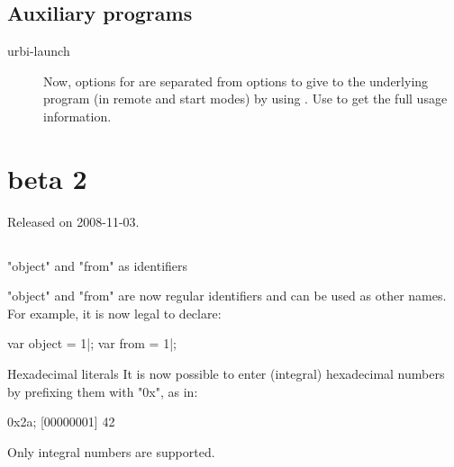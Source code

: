 \subsection{Auxiliary programs}

\begin{description}
\item[urbi-launch] Now, options for  are separated from
  options to give to the underlying program (in remote and start modes) by
  using \option{--}. Use  to get the full usage
  information.
\end{description}



\section{ beta 2}
Released on 2008-11-03.

\subsection{\us}

\begin{description}
\item "object" and "from" as identifiers

  "object" and "from" are now regular identifiers and can be used as other
  names.  For example, it is now legal to declare:

\begin{urbiscript}
var object = 1|;
var from = 1|;
\end{urbiscript}

\item Hexadecimal literals
  It is now possible to enter (integral) hexadecimal numbers by
  prefixing them with "0x", as in:

\begin{urbiscript}
0x2a;
[00000001] 42
\end{urbiscript}

Only integral numbers are supported.

\end{description}

